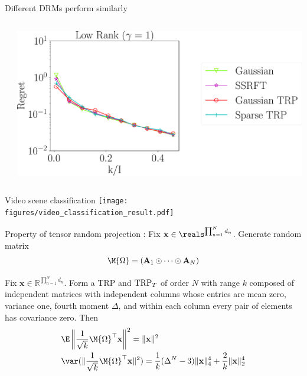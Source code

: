 \documentclass[handout,xcolor={usenames,dvipsnames}]{beamer}
\begin{document}
\begin{frame}{Different DRMs perform similarly}
\begin{columns}
\begin{column}{0.3\textwidth}
	\end{column}
	\begin{column}{0.6\textwidth}
		\includegraphics[scale = 0.25]{fig2_lk_hnoise_600.pdf}
	\end{column}
\end{columns}


\end{frame}

\begin{frame}{Video scene classification}
\texttt{[image: \\figures/video\_classification\_result.pdf]} \\

\end{frame}


\begin{frame}{Property of tensor random projection}
:
Fix $\mathbf{x} \in \reals^{\prod_{n=1}^N d_n}$. Generate random matrix 
\[
\M{\Omega}= (\mathbf{A}_1 \odot \cdots \odot \mathbf{A}_N)
\]
\begin{thm}
	Fix $\mathbf{x} \in \mathbb{R}^{\prod_{n=1}^N d_n}$.
	Form a TRP and $\textup{TRP}_T$ of order $N$ with range $k$
	composed of independent matrices with independent columns
	whose entries are mean zero, variance one, fourth moment $\Delta$, and within each column every pair of elements has covariance zero.
	Then
\begin{equation}
\begin{aligned}
& \E \left\| \frac{1}{\sqrt{k}}\M{\Omega}^\top \mathbf{x} \right\|^2 = \|\mathbf{x}\|^2  \\
& \var(\|\frac{1}{\sqrt{k}}\M{\Omega}^\top \mathbf{x}\|^2) = \frac{1}{k}(\Delta^N-3)\|\mathbf{x}\|_4^4 + \frac{2}{k}\|\mathbf{x}\|_2^4 
\end{aligned}
\end{equation}
\end{thm}
\end{frame}
\end{document}
